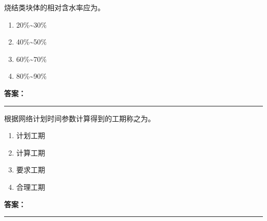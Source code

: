 \documentclass[UTF8,fontset=fandol,11pt]{ctexart}
\newcommand{\answerline}{\textcolor{answerred}{\rule{2.4cm}{0.7pt}}}
\begin{document}
\begin{quizbox}[title={乱序第 206 题｜第六章砌筑工程}]

烧结类块体的相对含水率应为。\\

\begin{enumerate}[label=\Alph*.]

\item 20\%\textasciitilde{}30\%

\item 40\%\textasciitilde{}50\%

\item 60\%\textasciitilde{}70\%

\item 80\%\textasciitilde{}90\%

\end{enumerate}

\textbf{\textcolor{answerred}{答案：}} \answerline

\end{quizbox}

\vspace{0.2em}

\begin{quizbox}[title={乱序第 207 题｜第十一章网络计划技术}]

根据网络计划时间参数计算得到的工期称之为。\\

\begin{enumerate}[label=\Alph*.]

\item 计划工期

\item 计算工期

\item 要求工期

\item 合理工期

\end{enumerate}

\textbf{\textcolor{answerred}{答案：}} \answerline

\end{quizbox}

\vspace{0.2em}
\end{document}
